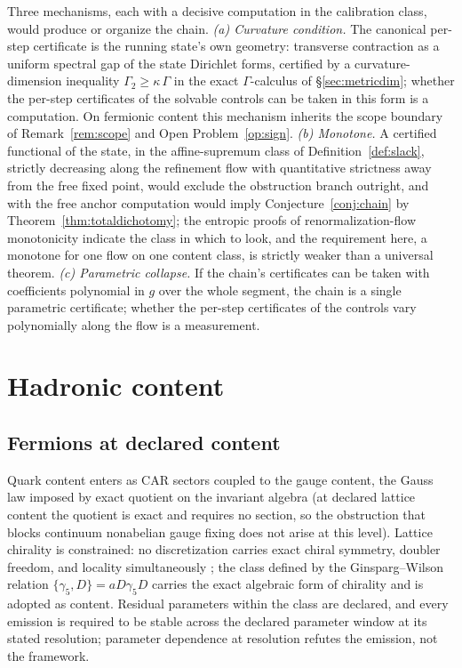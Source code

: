 \documentclass[11pt]{article}
\theoremstyle{definition}
\theoremstyle{remark}
\begin{document}
Three mechanisms, each with a decisive computation in the calibration
class, would produce or organize the chain.  \emph{(a) Curvature
condition.}  The canonical per-step certificate is the running state's
own geometry: transverse contraction as a uniform spectral gap of the
state Dirichlet forms, certified by a curvature-dimension inequality
$\Gamma_2 \ge \kappa\,\Gamma$ \cite{bakry} in the exact $\Gamma$-calculus
of \S\ref{sec:metricdim}; whether the per-step certificates of the
solvable controls can be taken in this form is a computation.  On
fermionic content this mechanism inherits the scope boundary of
Remark~\ref{rem:scope} and Open Problem~\ref{op:sign}.  \emph{(b)
Monotone.}  A certified functional of the state, in the affine-supremum
class of Definition~\ref{def:slack}, strictly decreasing along the
refinement flow with quantitative strictness away from the free fixed
point, would exclude the obstruction branch outright, and with the free
anchor computation would imply Conjecture~\ref{conj:chain} by
Theorem~\ref{thm:totaldichotomy}; the entropic proofs of
renormalization-flow monotonicity \cite{casini} indicate the class in
which to look, and the requirement here, a monotone for one flow on one
content class, is strictly weaker than a universal theorem.  \emph{(c)
Parametric collapse.}  If the chain's certificates can be taken with
coefficients polynomial in $g$ over the whole segment, the chain is a
single parametric certificate; whether the per-step certificates of the
controls vary polynomially along the flow is a measurement.

\section{Hadronic content}\label{sec:hadrons}

\subsection{Fermions at declared content}
Quark content enters as CAR sectors coupled to the gauge content, the
Gauss law imposed by exact quotient on the invariant algebra (at declared
lattice content the quotient is exact and requires no section, so the
obstruction that blocks continuum nonabelian gauge fixing does not arise
at this level).  Lattice chirality is constrained: no discretization
carries exact chiral symmetry, doubler freedom, and locality
simultaneously \cite{nielsen}; the class defined by the Ginsparg--Wilson
relation $\{\gamma_5, D\} = a D\gamma_5 D$ \cite{ginsparg,luscherchiral}
carries the exact algebraic form of chirality and is adopted as content.
Residual parameters within the class are declared, and every emission is
required to be stable across the declared parameter window at its stated
resolution; parameter dependence at resolution refutes the emission, not
the framework.
\end{document}
